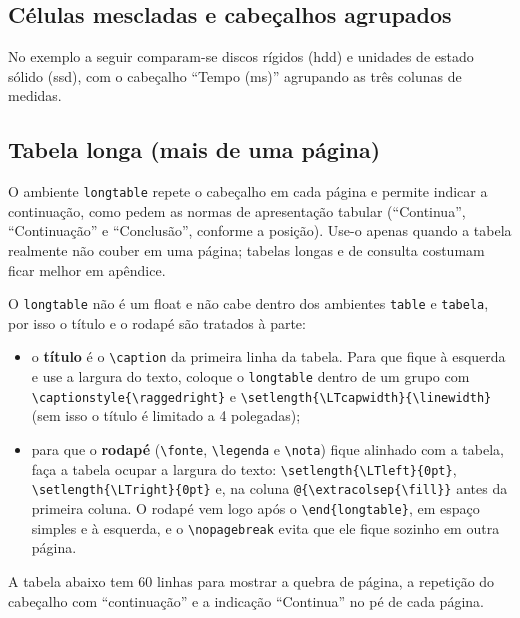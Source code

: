 \subsection{Células mescladas e cabeçalhos agrupados}

No exemplo a seguir comparam-se discos rígidos (\ac{hdd}) e unidades de estado sólido
(\ac{ssd}), com o cabeçalho ``Tempo (ms)'' agrupando as três colunas de medidas.


\subsection{Tabela longa (mais de uma página)}

O ambiente \texttt{longtable} repete o cabeçalho em cada página e permite indicar a
continuação, como pedem as normas de apresentação tabular (``Continua'', ``Continuação''
e ``Conclusão'', conforme a posição). Use-o apenas quando a tabela realmente não couber
em uma página; tabelas longas e de consulta costumam ficar melhor em apêndice.

O \texttt{longtable} não é um float e não cabe dentro dos ambientes \texttt{table} e
\texttt{tabela}, por isso o título e o rodapé são tratados à parte:
\begin{itemize}
  \item o \textbf{título} é o \texttt{\textbackslash caption} da primeira linha da tabela. Para
        que fique à esquerda e use a largura do texto, coloque o \texttt{longtable} dentro de
        um grupo com
        \texttt{\textbackslash captionstyle\allowbreak\{\textbackslash raggedright\}} e
        \texttt{\textbackslash setlength\allowbreak\{\textbackslash LTcapwidth\}\allowbreak\{\textbackslash linewidth\}} (sem isso o
        título é limitado a 4 polegadas);
  \item para que o \textbf{rodapé} (\texttt{\textbackslash fonte}, \texttt{\textbackslash legenda} e
        \texttt{\textbackslash nota}) fique alinhado com a tabela, faça a tabela ocupar a largura do
        texto: \texttt{\textbackslash setlength\{\textbackslash LTleft\}\{0pt\}},
        \texttt{\textbackslash setlength\{\textbackslash LTright\}\{0pt\}} e, na coluna
        \texttt{@\{\textbackslash extracolsep\{\textbackslash fill\}\}} antes da primeira
        coluna. O rodapé vem logo após o \texttt{\textbackslash end\{longtable\}}, em espaço simples e à
        esquerda, e o \texttt{\textbackslash nopagebreak} evita que ele fique sozinho em outra página.
\end{itemize}
A tabela abaixo tem 60 linhas para mostrar a quebra de página, a repetição do cabeçalho com
``continuação'' e a indicação ``Continua'' no pé de cada página.

